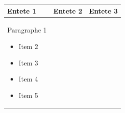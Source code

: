 \documentclass[11pt,a4paper]{article}
\begin{document}
\begin{table}[h]
\begin{tabular}{|l|l|l|}
\hline
Entete 1 & Entete 2 & Entete 3 \\ \hline
Paragraphe 1  \begin{itemize} \item Item 2 \end{itemize}  \begin{itemize} \item Item 3 \end{itemize}  \begin{itemize} \item Item 4 \end{itemize}  \begin{itemize} \item Item 5 \end{itemize} &  &  \\ \hline
\end{tabular}
\end{table}
\end{document}

